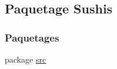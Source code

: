 \hypertarget{namespaceSushis}{}\subsection{Paquetage Sushis}
\label{namespaceSushis}
\subsubsection*{Paquetages}
\begin{DoxyCompactItemize}
\item 
package \hyperlink{namespaceSushis_1_1src}{src}
\end{DoxyCompactItemize}

